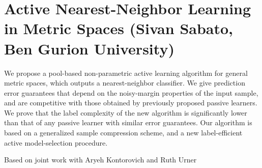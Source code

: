 \section{Active Nearest-Neighbor Learning in Metric Spaces
(Sivan Sabato, Ben Gurion University)}

We propose a pool-based non-parametric active learning algorithm for general metric spaces, which outputs a nearest-neighbor classifier. We give prediction error guarantees that depend on the noisy-margin properties of the input sample, and are competitive with those obtained by previously proposed passive learners. We prove that the label complexity of  the new algorithm is significantly lower than that of any passive learner with similar error guarantees. Our algorithm is based on a generalized sample compression scheme, and a new label-efficient active model-selection procedure.

Based on joint work with Aryeh Kontorovich and Ruth Urner